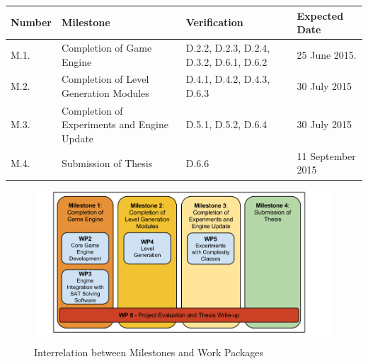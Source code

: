 \documentclass[a4paper]{article}
\begin{document}
\begin{center}
    \begin{tabular}{ | p{1.2cm}  | p{6.2cm} | p{4cm} | p{3cm} |}
    \hline
    \rowcolor{Gray}
    Number & Milestone & Verification & Expected Date \\ \hline

    M.1. & Completion of Game Engine & D.2.2, D.2.3, D.2.4, D.3.2, D.6.1, D.6.2 & 25 June 2015. \\ \hline

    M.2. & Completion of Level Generation Modules & D.4.1, D.4.2, D.4.3, D.6.3 & 30 July 2015 \\ \hline

    M.3. & Completion of Experiments and Engine Update & D.5.1, D.5.2, D.6.4 & 30 July 2015 \\ \hline

    M.4. & Submission of Thesis & D.6.6 & 11 September 2015 \\ \hline

    \hline
    \end{tabular}
    \label{milestones}
\end{center}

\begin{figure}[htbp]
  \centering
  \includegraphics[scale=0.4]{organisation(1)}
  \vspace{-3mm}
  \caption{Interrelation between Milestones and Work Packages}
  \label{org}
\end{figure}


\pagebreak
\end{document}
